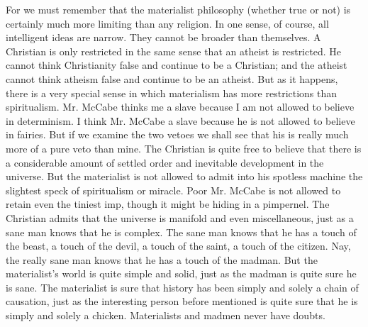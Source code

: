 For we must remember that the materialist philosophy (whether true or not) is certainly much more limiting than any religion. In one sense, of course, all intelligent ideas are narrow. They cannot be broader than themselves. A Christian is only restricted in the same sense that an atheist is restricted. He cannot think Christianity false and continue to be a Christian; and the atheist cannot think atheism false and continue to be an atheist. But as it happens, there is a very special sense in which materialism has more restrictions than spiritualism. Mr. McCabe thinks me a slave because I am not allowed to believe in determinism. I think Mr. McCabe a slave because he is not allowed to believe in fairies. But if we examine the two vetoes we shall see that his is really much more of a pure veto than mine. The Christian is quite free to believe that there is a considerable amount of settled order and inevitable development in the universe. But the materialist is not allowed to admit into his spotless machine the slightest speck of spiritualism or miracle. Poor Mr. McCabe is not allowed to retain even the tiniest imp, though it might be hiding in a pimpernel. The Christian admits that the universe is manifold and even miscellaneous, just as a sane man knows that he is complex. The sane man knows that he has a touch of the beast, a touch of the devil, a touch of the saint, a touch of the citizen. Nay, the really sane man knows that he has a touch of the madman. But the materialist’s world is quite simple and solid, just as the madman is quite sure he is sane. The materialist is sure that history has been simply and solely a chain of causation, just as the interesting person before mentioned is quite sure that he is simply and solely a chicken. Materialists and madmen never have doubts.

